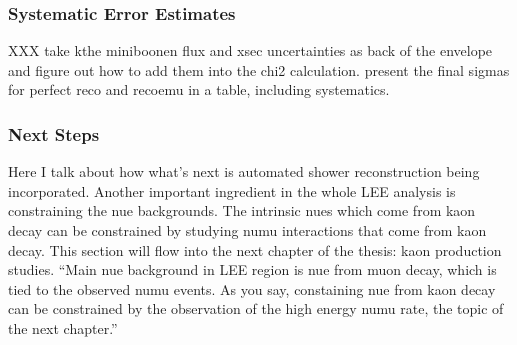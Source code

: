 \subsubsection{Systematic Error Estimates}
XXX take kthe miniboonen flux and xsec uncertainties as back of the envelope and figure out how to add them into the chi2 calculation. present the final sigmas for perfect reco and recoemu in a table, including systematics.

\subsubsection{Next Steps}
Here I talk about how what's next is automated shower reconstruction being incorporated. Another important ingredient in the whole LEE analysis is constraining the nue backgrounds. The intrinsic nues which come from kaon decay can be constrained by studying numu interactions that come from kaon decay. This section will flow into the next chapter of the thesis: kaon production studies. ``Main nue background in LEE region is nue from muon decay, which is tied to the observed numu events. As you say, constaining nue from kaon decay can be constrained by the observation of the high energy numu rate, the topic of the next chapter.''

